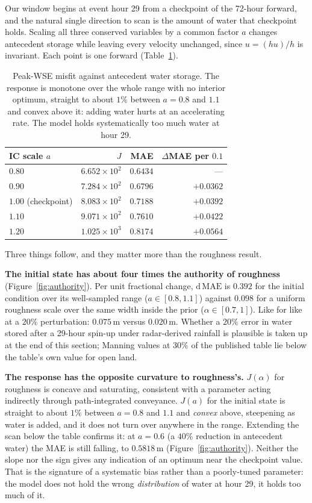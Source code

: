\documentclass[11pt]{article}
\begin{document}
Our window begins at event hour 29 from a checkpoint of the
72-hour forward, and the natural single direction to scan is the
amount of water that checkpoint holds. Scaling all three conserved variables by a common
factor $a$ changes antecedent storage while leaving every velocity
unchanged, since $u = (hu)/h$ is invariant. Each point is one forward
(Table~\ref{tab:ic}).

\begin{table}
\centering\small
\begin{tabular}{@{}lrrr@{}}
\toprule
IC scale $a$ & $J$ & MAE & $\Delta$MAE per $0.1$ \\
\midrule
$0.80$ & $6.652\times10^{2}$ & $0.6434$ & --- \\
$0.90$ & $7.284\times10^{2}$ & $0.6796$ & $+0.0362$ \\
$1.00$ (checkpoint) & $8.083\times10^{2}$ & $0.7188$ & $+0.0392$ \\
$1.10$ & $9.071\times10^{2}$ & $0.7610$ & $+0.0422$ \\
$1.20$ & $1.025\times10^{3}$ & $0.8174$ & $+0.0564$ \\
\bottomrule
\end{tabular}
\caption{Peak-WSE misfit against antecedent water storage. The response
is monotone over the whole range with no interior optimum, straight to
about $1\%$ between $a = 0.8$ and $1.1$ and convex above it: adding
water hurts at an accelerating rate. The model holds systematically too
much water at hour 29.}
\label{tab:ic}
\end{table}

Three things follow, and they matter more than the roughness result.

\textbf{The initial state has about four times the authority of
roughness} (Figure~\ref{fig:authority}). Per unit fractional change, $\mathrm{d}\,\mathrm{MAE}$ is
$0.392$ for the initial condition over its well-sampled range
($a \in [0.8, 1.1]$) against $0.098$ for a uniform roughness scale
over the same width inside the prior ($\alpha \in [0.7, 1]$). Like for like at a $20\%$ perturbation: $0.075$\,m
versus $0.020$\,m. Whether a $20\%$ error in water stored after a
29-hour spin-up under radar-derived rainfall is plausible is taken up
at the end of this section; Manning values at $30\%$ of the published
table lie below the table's own value for open land.

\textbf{The response has the opposite curvature to roughness's.}
$J(\alpha)$ for roughness is concave and saturating, consistent with
a parameter acting indirectly through path-integrated conveyance.
$J(a)$ for the initial state is straight to about $1\%$ between
$a = 0.8$ and $1.1$ and \emph{convex} above, steepening as water is
added, and it does not turn over anywhere in the range. Extending the
scan below the table confirms it: at $a = 0.6$ (a $40\%$ reduction in
antecedent water) the MAE is still falling, to $0.5818$\,m
(Figure~\ref{fig:authority}). Neither the slope nor the sign gives
any indication of an optimum near the checkpoint value. That is the
signature of a systematic bias rather than a poorly-tuned parameter:
the model does not hold the wrong \emph{distribution} of water at
hour 29, it holds too much of it.
\end{document}
